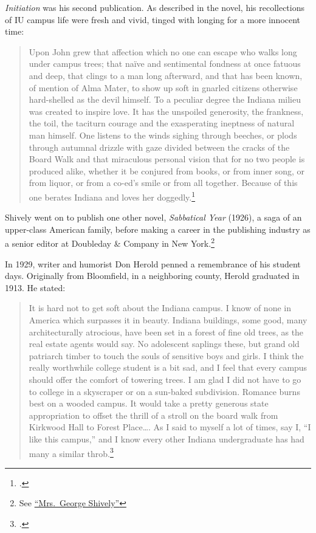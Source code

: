 \documentclass[
  american,
  letterpaper,
]{scrreprt}
\newcounter{none} %
\begin{document}
\emph{Initiation} was his second publication. As described in the novel,
his recollections of IU campus life were fresh and vivid, tinged with
longing for a more innocent time:

\begin{quote}
Upon John grew that affection which no one can escape who walks long
under campus trees; that naïve and sentimental fondness at once fatuous
and deep, that clings to a man long afterward, and that has been known,
of mention of Alma Mater, to show up soft in gnarled citizens otherwise
hard-shelled as the devil himself. To a peculiar degree the Indiana
milieu was created to inspire love. It has the unspoiled generosity, the
frankness, the toil, the taciturn courage and the exasperating ineptness
of natural man himself. One listens to the winds sighing through
beeches, or plods through autumnal drizzle with gaze divided between the
cracks of the Board Walk and that miraculous personal vision that for no
two people is produced alike, whether it be conjured from books, or from
inner song, or from liquor, or from a co-ed's smile or from all
together. Because of this one berates Indiana and loves her
doggedly.\footnote{.}
\end{quote}

Shively went on to publish one other novel, \emph{Sabbatical Year}
(1926), a saga of an upper-class American family, before making a career
in the publishing industry as a senior editor at Doubleday \& Company in
New York.\footnote{See
  \href{https://www.nytimes.com/1973/02/06/archives/mrs-george-shively.html?smid=url-share}{``Mrs.~George
  Shively''}}

In 1929, writer and humorist Don Herold penned a remembrance of his
student days. Originally from Bloomfield, in a neighboring county,
Herold graduated in 1913. He stated:

\begin{quote}
It is hard not to get soft about the Indiana campus. I know of none in
America which surpasses it in beauty. Indiana buildings, some good, many
architecturally atrocious, have been set in a forest of fine old trees,
as the real estate agents would say. No adolescent saplings these, but
grand old patriarch timber to touch the souls of sensitive boys and
girls. I think the really worthwhile college student is a bit sad, and I
feel that every campus should offer the comfort of towering trees. I am
glad I did not have to go to college in a skyscraper or on a sun-baked
subdivision. Romance burns best on a wooded campus. It would take a
pretty generous state appropriation to offset the thrill of a stroll on
the board walk from Kirkwood Hall to Forest Place\ldots. As I said to
myself a lot of times, say I, ``I like this campus,'' and I know every
other Indiana undergraduate has had many a similar throb.\footnote{.}
\end{quote}
\end{document}
